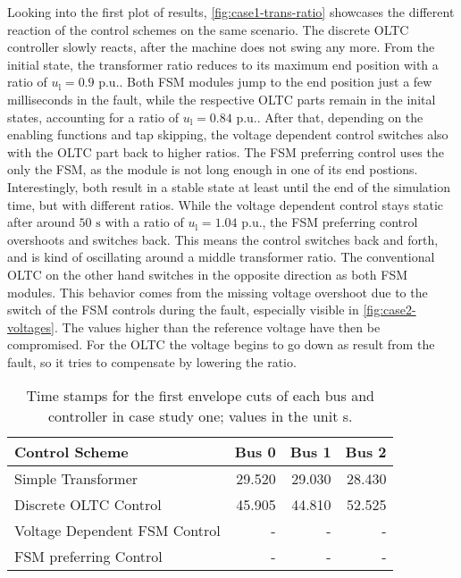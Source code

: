 {}
Looking into the first plot of results, \autoref{fig:case1-trans-ratio} showcases the different reaction of the control schemes on the same scenario.
The discrete \acs{OLTC} controller slowly reacts, after the machine does not swing any more.
From the initial state, the transformer ratio reduces to its maximum end position with a ratio of $u_\mathrm{l}=0.9\text{ p.u.}$.
Both \acs{FSM} modules jump to the end position just a few milliseconds in the fault, while the respective \acs{OLTC} parts remain in the inital states, accounting for a ratio of $u_\mathrm{l}=0.84\text{ p.u.}$.
After that, depending on the enabling functions and tap skipping, the voltage dependent control switches also with the \acs{OLTC} part back to higher ratios.
The \acs{FSM} preferring control uses the only the \acs{FSM}, as the module is not long enough in one of its end postions.
Interestingly, both result in a stable state at least until the end of the simulation time, but with different ratios.
While the voltage dependent control stays static after around $50\text{ s}$ with a ratio of $u_\mathrm{l}=1.04\text{ p.u.}$, the \acs{FSM} preferring control overshoots and switches back.
This means the control switches back and forth, and is kind of oscillating around a middle transformer ratio.
The conventional \acs{OLTC} on the other hand switches in the opposite direction as both \acs{FSM} modules.
This behavior comes from the missing voltage overshoot due to the switch of the \acs{FSM} controls during the fault, especially visible in \autoref{fig:case2-voltages}.
The values higher than the reference voltage have then be compromised.
For the \acs{OLTC} the voltage begins to go down as result from the fault, so it tries to compensate by lowering the ratio.

\begin{table}[htbp!]
    \caption[Time stamps for the first envelope cuts of each bus and controller in case study one]{Time stamps for the first envelope cuts of each bus and controller in case study one; values in the unit s.}
    \label{tab:case1-critical-times}
    \vspace*{12pt}
    \centering
    \small
    \begin{tabularx}{\textwidth}{Xrrr}
        \textbf{Control Scheme} & \textbf{Bus 0} & \textbf{Bus 1} & \textbf{Bus 2} \\ \hline
        \toprule
        Simple Transformer                  & 29.520 & 29.030 & 28.430 \\
        Discrete \acs{OLTC} Control         & 45.905 & 44.810 & 52.525 \\
        Voltage Dependent \acs{FSM} Control & - & - & - \\
        \acs{FSM} preferring Control        & - & - & -  \\
        \bottomrule
    \end{tabularx}
\end{table}

